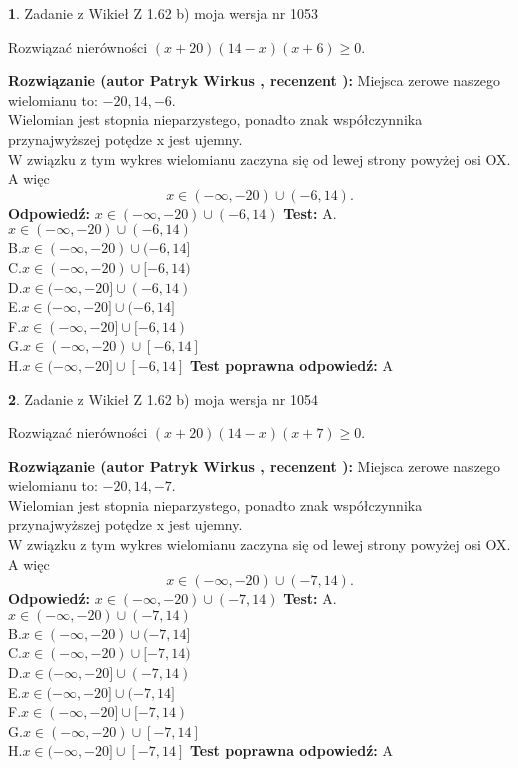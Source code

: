 \documentclass[12pt, a4paper]{article}
\theoremstyle{definition} %
\newtheorem{zad}{}
\newcommand{\zadStart}[1]{\begin{zad}#1\newline}
\newcommand{\zadStop}{\end{zad}}
\newcommand{\rozwStart}[2]{\noindent \textbf{Rozwiązanie (autor #1 , recenzent #2): }\newline}
\newcommand{\rozwStop}{\newline}
\newcommand{\odpStart}{\noindent \textbf{Odpowiedź:}\newline}
\newcommand{\odpStop}{\newline}
\newcommand{\testStart}{\noindent \textbf{Test:}\newline}
\newcommand{\testStop}{\newline}
\newcommand{\kluczStart}{\noindent \textbf{Test poprawna odpowiedź:}\newline}
\newcommand{\kluczStop}{\newline}
\begin{document}
\zadStart{Zadanie z Wikieł Z 1.62 b) moja wersja nr 1053}

Rozwiązać nierówności $(x+20)(14-x)(x+6)\ge0$.
\zadStop
\rozwStart{Patryk Wirkus}{}
Miejsca zerowe naszego wielomianu to: $-20, 14, -6$.\\
Wielomian jest stopnia nieparzystego, ponadto znak współczynnika przy\linebreak najwyższej potędze x jest ujemny.\\ W związku z tym wykres wielomianu zaczyna się od lewej strony powyżej osi OX. A więc $$x \in (-\infty,-20) \cup (-6,14).$$
\rozwStop
\odpStart
$x \in (-\infty,-20) \cup (-6,14)$
\odpStop
\testStart
A.$x \in (-\infty,-20) \cup (-6,14)$\\
B.$x \in (-\infty,-20) \cup (-6,14]$\\
C.$x \in (-\infty,-20) \cup [-6,14)$\\
D.$x \in (-\infty,-20] \cup (-6,14)$\\
E.$x \in (-\infty,-20] \cup (-6,14]$\\
F.$x \in (-\infty,-20] \cup [-6,14)$\\
G.$x \in (-\infty,-20) \cup [-6,14]$\\
H.$x \in (-\infty,-20] \cup [-6,14]$
\testStop
\kluczStart
A
\kluczStop



\zadStart{Zadanie z Wikieł Z 1.62 b) moja wersja nr 1054}

Rozwiązać nierówności $(x+20)(14-x)(x+7)\ge0$.
\zadStop
\rozwStart{Patryk Wirkus}{}
Miejsca zerowe naszego wielomianu to: $-20, 14, -7$.\\
Wielomian jest stopnia nieparzystego, ponadto znak współczynnika przy\linebreak najwyższej potędze x jest ujemny.\\ W związku z tym wykres wielomianu zaczyna się od lewej strony powyżej osi OX. A więc $$x \in (-\infty,-20) \cup (-7,14).$$
\rozwStop
\odpStart
$x \in (-\infty,-20) \cup (-7,14)$
\odpStop
\testStart
A.$x \in (-\infty,-20) \cup (-7,14)$\\
B.$x \in (-\infty,-20) \cup (-7,14]$\\
C.$x \in (-\infty,-20) \cup [-7,14)$\\
D.$x \in (-\infty,-20] \cup (-7,14)$\\
E.$x \in (-\infty,-20] \cup (-7,14]$\\
F.$x \in (-\infty,-20] \cup [-7,14)$\\
G.$x \in (-\infty,-20) \cup [-7,14]$\\
H.$x \in (-\infty,-20] \cup [-7,14]$
\testStop
\kluczStart
A
\kluczStop
\end{document}
